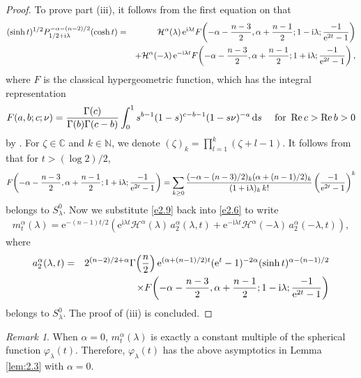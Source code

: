 \documentclass[11pt]{amsproc}
\newcommand{\e}{\mathrm{e}}
\newcommand{\0}{\mathbf{0}}
\newcommand{\bc}{{ \mathcal{H} }}
\newcommand{\CC}{\mathbb{C}}
\renewcommand{\Re}{\mathop{\mathrm{Re}}}
\renewcommand{\i}{\mathrm{i}}
\renewcommand{\d}{\mathrm{d}}
\numberwithin{equation}{section}
\numberwithin{figure}{section}
\theoremstyle{definition}
\theoremstyle{remark}
\newtheorem{rk}[thm]{Remark}
\numberwithin{thm}{section}
\begin{document}
\begin{proof}
To prove part (iii), it follows from the first equation on \cite[p. 262]{Sc} that
\begin{eqnarray}\label{e2.9}
(\sinh t)^{1/2}P^{-\alpha-(n-2)/2}_{1/2+\i\lambda}(\cosh t)
&=& \bc^\alpha(\lambda)\,\e^{\i\lambda t}F\!\left(-\alpha-{n-3\over 2},\alpha+{n-1\over 2};1-\i\lambda;{-1\over \e^{2t}-1}\right)\notag\\
&&+ \bc^\alpha(-\lambda)\,\e^{-\i\lambda t}F\!\left(-\alpha-{n-3\over 2},\alpha+{n-1\over 2};1+\i\lambda;{-1\over \e^{2t}-1}\right),
\end{eqnarray}
where $F$ is the classical hypergeometric function, which has the integral representation
\begin{eqnarray*}
F(a,b;c;\nu)={\Gamma(c)\over \Gamma(b)\Gamma(c-b)}\int_0^1s^{b-1}(1-s)^{c-b-1}(1-s\nu)^{-a}\,\d s\ \ \ \ \mbox{for }\Re c>\Re b>0
\end{eqnarray*}
by \cite[p. 59, (10)]{Er}. For $\zeta\in \CC$ and $k\in{\mathbb N}$, we denote $
(\zeta)_k=\prod_{l=1}^k(\zeta+l-1)
$.
It follows from  \cite[p. 76, (10)]{Er} that   for $t>(\log 2)/2$,
\begin{eqnarray*}
F\!\left(-\alpha-{n-3\over 2},\alpha+{n-1\over 2};1+\i\lambda;{-1\over \e^{2t}-1}\right)
=\sum_{k\geq 0}{(-\alpha-(n-3)/2)_k(\alpha+(n-1)/2)_k\over (1+\i\lambda)_k\,k!}\left({-1\over \e^{2t}-1}\right)^k
\end{eqnarray*}
belongs to $S^0_\lambda$. Now we substitute  \eqref{e2.9} back into \eqref{e2.6} to  write
\begin{eqnarray*}
m^\alpha_t(\lambda)=\e^{-(n-1)t/2}\left(\e^{\i\lambda t}\bc^\alpha(\lambda)\,a^\alpha_2(\lambda,t)+\e^{-\i\lambda t}\bc^\alpha(-\lambda)\,a^\alpha_2(-\lambda,t)\right),
\end{eqnarray*}
where
\begin{eqnarray*}
a^\alpha_2(\lambda,t)&=&2^{(n-2)/2+\alpha}\Gamma\! \left({n\over 2}\right)
\e^{(\alpha+(n-1)/2)t}  (\e^t -1)^{-2\alpha} (\sinh t)^{\alpha-(n-1)/2}\\
&&\times F\!\left(-\alpha-{n-3\over 2},\alpha+{n-1\over 2};1-\i\lambda;{-1\over \e^{2t}-1}\right)
\end{eqnarray*}
belongs to $S^0_\lambda$. The proof of (iii) is concluded.
\end{proof}
\begin{rk}\label{rk:2.5}
When $\alpha=0$, $m^\alpha_t(\lambda)$ is exactly a constant multiple of the spherical function $\varphi_\lambda(t)$. Therefore, $\varphi_\lambda(t)$ has the above asymptotics in Lemma \ref{lem:2.3} with $\alpha=0$.
\end{rk}
\end{document}
